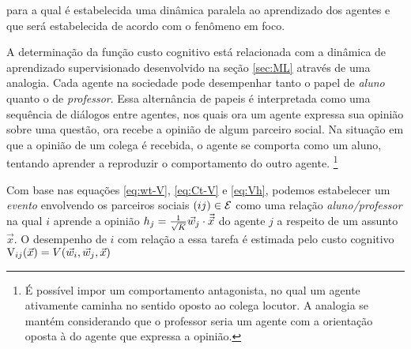 para a qual é estabelecida uma dinâmica paralela ao aprendizado dos
agentes e que será estabelecida de acordo com o fenômeno em foco.

A determinação da função custo cognitivo está relacionada com a
dinâmica de aprendizado supervisionado desenvolvido na seção
\ref{sec:ML} através de uma analogia. Cada agente na sociedade pode
desempenhar tanto o papel de \emph{ aluno} quanto o de
\emph{professor}.  Essa alternância de papeis é interpretada como uma
sequência de diálogos entre agentes, nos quais ora um agente expressa
sua opinião sobre uma questão, ora recebe a opinião de algum parceiro
social. Na situação em que a opinião de um colega é recebida, o agente
se comporta como um aluno, tentando aprender a reproduzir o
comportamento do outro agente.
\footnote{É possível impor um comportamento antagonista, no qual um agente
  ativamente caminha no sentido oposto ao colega locutor. A analogia se mantém
  considerando que o professor seria um agente com a orientação oposta à do
  agente que expressa a opinião.}

Com base nas equações \eqref{eq:wt-V}, \eqref{eq:Ct-V} e
\eqref{eq:Vh}, podemos estabelecer um \emph{evento} envolvendo os
parceiros sociais $(ij) \in \mathcal{E}$ como uma relação
\emph{aluno/professor} na qual $i$ aprende a opinião $h_j =
{1\over \sqrt{K}} \vec{w}_{j} \cdot \vec{\vec{x}}$ do agente $j$ a respeito de um assunto $\vec{x}$.  O
desempenho de $i$ com relação a essa tarefa é estimada pelo custo
cognitivo ${\mathrm{V}}_{ij}(\vec{x}) = V(\vec{w}_{i},\vec{w}_{j},\vec{x})$

